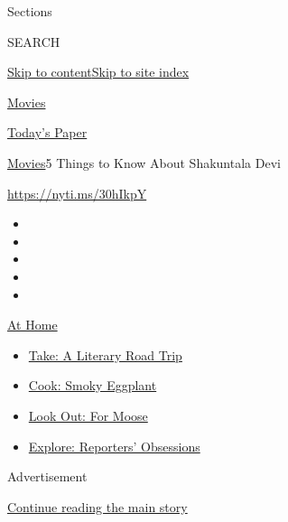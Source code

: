 Sections

SEARCH

\protect\hyperlink{site-content}{Skip to
content}\protect\hyperlink{site-index}{Skip to site index}

\href{https://www.nytimes.com/section/movies}{Movies}

\href{https://myaccount.nytimes.com/auth/login?response_type=cookie\&client_id=vi}{}

\href{https://www.nytimes.com/section/todayspaper}{Today's Paper}

\href{/section/movies}{Movies}\textbar{}5 Things to Know About
Shakuntala Devi

\url{https://nyti.ms/30hIkpY}

\begin{itemize}
\item
\item
\item
\item
\item
\end{itemize}

\href{https://www.nytimes.com/spotlight/at-home?action=click\&pgtype=Article\&state=default\&region=TOP_BANNER\&context=at_home_menu}{At
Home}

\begin{itemize}
\tightlist
\item
  \href{https://www.nytimes.com/2020/07/28/books/time-for-a-literary-road-trip.html?action=click\&pgtype=Article\&state=default\&region=TOP_BANNER\&context=at_home_menu}{Take:
  A Literary Road Trip}
\item
  \href{https://www.nytimes.com/2020/07/29/magazine/bored-with-your-home-cooking-some-smoky-eggplant-will-fix-that.html?action=click\&pgtype=Article\&state=default\&region=TOP_BANNER\&context=at_home_menu}{Cook:
  Smoky Eggplant}
\item
  \href{https://www.nytimes.com/2020/07/27/travel/moose-michigan-isle-royale.html?action=click\&pgtype=Article\&state=default\&region=TOP_BANNER\&context=at_home_menu}{Look
  Out: For Moose}
\item
  \href{https://www.nytimes.com/interactive/2020/at-home/even-more-reporters-editors-diaries-lists-recommendations.html?action=click\&pgtype=Article\&state=default\&region=TOP_BANNER\&context=at_home_menu}{Explore:
  Reporters' Obsessions}
\end{itemize}

Advertisement

\protect\hyperlink{after-top}{Continue reading the main story}

